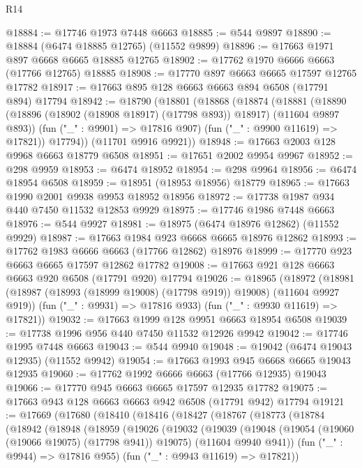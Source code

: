 \begin{lexlean}{R14}
\begin{coremodule}
@18884 := @17746 @1973 @7448 @6663
@18885 := @544 @9897
@18890 := @18884 (@6474 @18885 @12765) (@11552 @9899)
@18896 := @17663 @1971 @897 @6668 @6665 @18885 @12765
@18902 := @17762 @1970 @6666 @6663 (@17766 @12765) @18885
@18908 := @17770 @897 @6663 @6665 @17597 @12765 @17782
@18917 := @17663 @895 @128 @6663 @6663 @894 @6508 (@17791 @894) @17794
@18942 := @18790
    (@18801
      (@18868
        (@18874
          (@18881
            (@18890 (@18896 (@18902 (@18908 @18917) (@17798 @893)) @18917) (@11604 @9897 @893))
            (fun ("_" : @9901) => @17816 @907)
            (fun ("_" : @9900 @11619) => @17821))
          @17794))
      (@11701 @9916 @9921))
@18948 := @17663 @2003 @128 @9968 @6663 @18779 @6508
@18951 := @17651 @2002 @9954 @9967
@18952 := @298 @9959
@18953 := @6474 @18952
@18954 := @298 @9964
@18956 := @6474 @18954 @6508
@18959 := @18951 (@18953 @18956) @18779
@18965 := @17663 @1990 @2001 @9938 @9953 @18952 @18956
@18972 := @17738 @1987 @934 @440 @7450 @11532 @12853 @9929
@18975 := @17746 @1986 @7448 @6663
@18976 := @544 @9927
@18981 := @18975 (@6474 @18976 @12862) (@11552 @9929)
@18987 := @17663 @1984 @923 @6668 @6665 @18976 @12862
@18993 := @17762 @1983 @6666 @6663 (@17766 @12862) @18976
@18999 := @17770 @923 @6663 @6665 @17597 @12862 @17782
@19008 := @17663 @921 @128 @6663 @6663 @920 @6508 (@17791 @920) @17794
@19026 := @18965
    (@18972
      (@18981 (@18987 (@18993 (@18999 @19008) (@17798 @919)) @19008) (@11604 @9927 @919))
      (fun ("_" : @9931) => @17816 @933)
      (fun ("_" : @9930 @11619) => @17821))
@19032 := @17663 @1999 @128 @9951 @6663 @18954 @6508
@19039 := @17738 @1996 @956 @440 @7450 @11532 @12926 @9942
@19042 := @17746 @1995 @7448 @6663
@19043 := @544 @9940
@19048 := @19042 (@6474 @19043 @12935) (@11552 @9942)
@19054 := @17663 @1993 @945 @6668 @6665 @19043 @12935
@19060 := @17762 @1992 @6666 @6663 (@17766 @12935) @19043
@19066 := @17770 @945 @6663 @6665 @17597 @12935 @17782
@19075 := @17663 @943 @128 @6663 @6663 @942 @6508 (@17791 @942) @17794
@19121 := @17669
    (@17680
      (@18410
        (@18416
          (@18427
            (@18767
              (@18773
                (@18784
                  (@18942
                    (@18948
                      (@18959
                        (@19026
                          (@19032
                            (@19039
                              (@19048
                                (@19054 (@19060 (@19066 @19075) (@17798 @941)) @19075)
                                (@11604 @9940 @941))
                              (fun ("_" : @9944) => @17816 @955)
                              (fun ("_" : @9943 @11619) => @17821))

\end{coremodule}
\end{lexlean}
